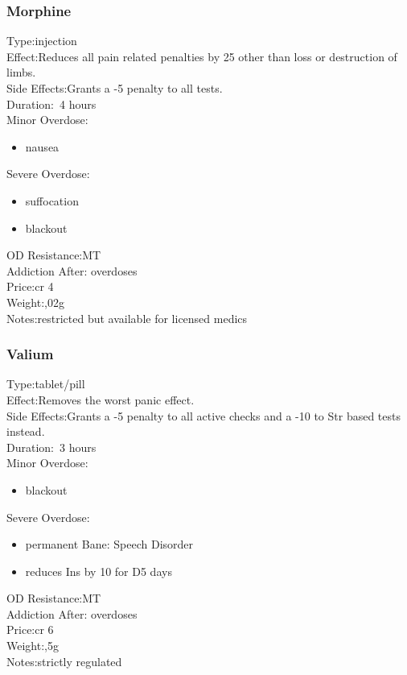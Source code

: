 \subsubsection{Morphine}
Type:\tab injection\\
Effect:\tab Reduces all pain related penalties by 25 other than loss or destruction of limbs.\\
Side Effects:\tab Grants a -5 penalty to all tests.\\
Duration:\tab ~4 hours\\
Minor Overdose:\\
\begin{itemize}
	\setlength\itemsep{-8mm}
	\vspace{-12mm}
	\item nausea
\end{itemize}
Severe Overdose:\\
\begin{itemize}
	\setlength\itemsep{-8mm}
	\vspace{-12mm}
	\item suffocation
	\item blackout
\end{itemize}
OD Resistance:\tab MT\\
Addiction After: overdoses\\
Price:\tab cr 4\\
Weight:,02g\\
Notes:\tab restricted but available for licensed medics


\subsubsection{Valium}
Type:\tab tablet/pill\\
Effect:\tab Removes the worst panic effect. \\
Side Effects:\tab Grants a -5 penalty to all active checks and a -10 to Str based tests instead. \\
Duration:\tab ~3 hours\\
Minor Overdose:\\
\begin{itemize}
	\setlength\itemsep{-8mm}
	\vspace{-12mm}
	\item blackout
\end{itemize}
Severe Overdose:\\
\begin{itemize}
	\setlength\itemsep{-8mm}
	\vspace{-12mm}
	\item permanent Bane: Speech Disorder
	\item reduces Ins by 10 for D5 days
\end{itemize}
OD Resistance:\tab MT\\
Addiction After: overdoses\\
Price:\tab cr 6\\
Weight:,5g\\
Notes:\tab strictly regulated


